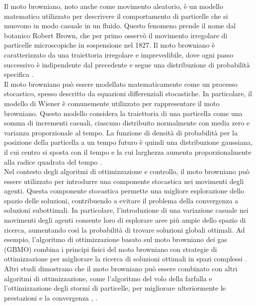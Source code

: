 \documentclass[twoside]{article}
\begin{document}
Il moto browniano, noto anche come movimento aleatorio, è un modello matematico utilizzato per descrivere il comportamento di particelle che si muovono in modo casuale in un fluido. Questo fenomeno prende il nome dal botanico Robert Brown, che per primo osservò il movimento irregolare di particelle microscopiche in sospensione nel 1827. Il moto browniano è caratterizzato da una traiettoria irregolare e imprevedibile, dove ogni passo successivo è indipendente dal precedente e segue una distribuzione di probabilità specifica \cite{StochasticProcesses}.\\

Il moto browniano può essere modellato matematicamente come un processo stocastico, spesso descritto da equazioni differenziali stocastiche. In particolare, il modello di Wiener è comunemente utilizzato per rappresentare il moto browniano. Questo modello considera la traiettoria di una particella come una somma di incrementi casuali, ciascuno distribuito normalmente con media zero e varianza proporzionale al tempo. La funzione di densità di probabilità per la posizione della particella a un tempo futuro è quindi una distribuzione gaussiana, il cui centro si sposta con il tempo e la cui larghezza aumenta proporzionalmente alla radice quadrata del tempo \cite{StochasticProcesses}.\\

Nel contesto degli algoritmi di ottimizzazione e controllo, il moto browniano può essere utilizzato per introdurre una componente stocastica nei movimenti degli agenti. Questa componente stocastica permette una migliore esplorazione dello spazio delle soluzioni, contribuendo a evitare il problema della convergenza a soluzioni subottimali. In particolare, l'introduzione di una variazione casuale nei movimenti degli agenti consente loro di esplorare aree più ampie dello spazio di ricerca, aumentando così la probabilità di trovare soluzioni globali ottimali. Ad esempio, l'algoritmo di ottimizzazione basato sul moto browniano dei gas (GBMO) combina i principi fisici del moto browniano con strategie di ottimizzazione per migliorare la ricerca di soluzioni ottimali in spazi complessi \cite{Abdechiri2013}. Altri studi dimostrano che il moto browniano può essere combinato con altri algoritmi di ottimizzazione, come l'algoritmo del volo della farfalla e l'ottimizzazione degli stormi di particelle, per migliorare ulteriormente le prestazioni e la convergenza \cite{Sowjanya2021}, \cite{Xiaohong2012}.

\vspace{\baselineskip}
\end{document}
